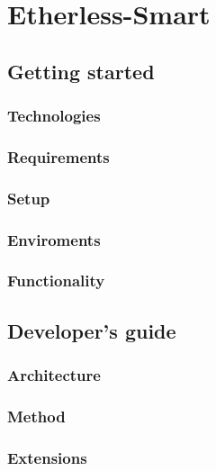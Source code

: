 \section{Etherless-Smart}
	
	\subsection{Getting started}
	
		\subsubsection{Technologies} %
		
		\subsubsection{Requirements} %
		
		\subsubsection{Setup} %
		
		\subsubsection{Enviroments} %
		
		\subsubsection{Functionality} %
	
	
	\subsection{Developer's guide}
	
		\subsubsection{Architecture} %
		
		\subsubsection{Method} %
		
		\subsubsection{Extensions}  %